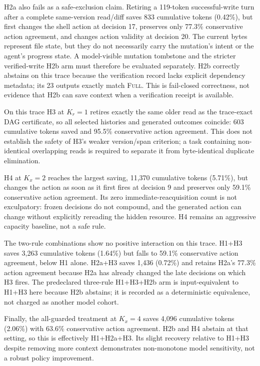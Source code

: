 \documentclass[11pt]{article}
\begin{document}
H2a also fails as a safe-exclusion claim. Retiring a 119-token successful-write
turn after a complete same-version read/diff saves 833 cumulative tokens
(0.42\%), but first changes the shell action at decision 17, preserves only
77.3\% conservative action agreement, and changes action validity at decision
20. The current bytes represent file state, but they do not necessarily carry
the mutation's intent or the agent's progress state. A model-visible mutation
tombstone and the stricter verified-write H2b arm must therefore be evaluated
separately. H2b correctly abstains on this trace because the verification
record lacks explicit dependency metadata; its 23 outputs exactly match
\textsc{Full}. This is fail-closed correctness, not evidence that H2b can save
context when a verification receipt is available.

On this trace H3 at $K_r=1$ retires exactly the same older read as the
trace-exact DAG certificate, so all selected histories and generated outcomes
coincide: 603 cumulative tokens saved and 95.5\% conservative action
agreement. This does not establish the safety of H3's weaker version/span
criterion; a task containing non-identical overlapping reads is required to
separate it from byte-identical duplicate elimination.

H4 at $K_x=2$ reaches the largest saving, 11,370 cumulative tokens (5.71\%),
but changes the action as soon as it first fires at decision 9 and preserves
only 59.1\% conservative action agreement. Its zero immediate-reacquisition
count is not exculpatory: frozen decisions do not compound, and the generated
action can change without explicitly rereading the hidden resource. H4 remains
an aggressive capacity baseline, not a safe rule.

The two-rule combinations show no positive interaction on this trace. H1+H3
saves 3,263 cumulative tokens (1.64\%) but falls to 59.1\% conservative action
agreement, below H1 alone. H2a+H3 saves 1,436 (0.72\%) and retains H2a's
77.3\% action agreement because H2a has already changed the late decisions on
which H3 fires. The predeclared three-rule H1+H3+H2b arm is input-equivalent to
H1+H3 here because H2b abstains; it is recorded as a deterministic equivalence,
not charged as another model cohort.

Finally, the all-guarded treatment at $K_x=4$ saves 4,096 cumulative tokens
(2.06\%) with 63.6\% conservative action agreement. H2b and H4 abstain at that
setting, so this is effectively H1+H2a+H3. Its slight recovery relative to
H1+H3 despite removing more context demonstrates non-monotone model
sensitivity, not a robust policy improvement.
\end{document}
